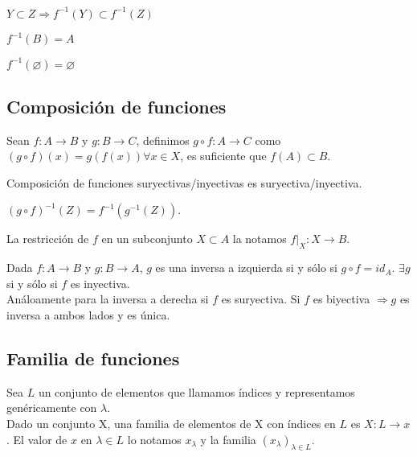 \begin{prop}
    $Y \subset Z \Rightarrow f^{-1}(Y) \subset f^{-1}(Z)$
\end{prop}

\begin{prop}
    $f^{-1}(B) = A$
\end{prop}

\begin{prop}
    $f^{-1}(\varnothing) = \varnothing$
\end{prop}

\subsection{Composición de funciones}

Sean $f: A \to B$ y $g: B \to C$, definimos $g \circ f: A \to C$ como $(g \circ f)(x) = g(f(x)) \forall x \in X$, es suficiente que $f(A) \subset B$.

\begin{prop}
    Composición de funciones suryectivas/inyectivas es suryectiva/inyectiva.
\end{prop}

\begin{prop}
    $(g \circ f)^{-1}(Z) = f^{-1}(g^{-1}(Z))$.
\end{prop}

\begin{definition}
    La restricción de $f$ en un subconjunto $X \subset A$ la notamos $f|_X: X \to B$.
\end{definition}

\begin{definition}
    Dada $f: A \to B$ y $g: B \to A$, $g$ es una inversa a izquierda si y sólo si $g \circ f = id_A$. $\exists g$ si y sólo si $f$ es inyectiva. \\
    Análoamente para la inversa a derecha si $f$ es suryectiva. 
    Si $f$ es biyectiva $\Rightarrow g$ es inversa a ambos lados y es única.
\end{definition}

\subsection{Familia de funciones}

Sea $L$ un conjunto de elementos que llamamos índices y representamos genéricamente con $\lambda$. \\

Dado un conjunto X, una familia de elementos de X con índices en $L$ es $X: L \to x$. El valor de $x$ en $\lambda \in L$ lo notamos $x_\lambda$ y la familia $(x_\lambda)_{\lambda \in L}$. \\

